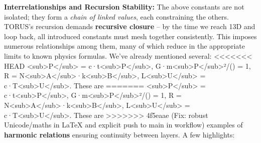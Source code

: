 \documentclass[]{article}
\begin{document}
\textbf{Interrelationships and Recursion Stability:} The above constants
are not isolated; they form a \emph{chain of linked values}, each
constraining the others. TORUS's recursion demands \textbf{recursive
closure} -- by the time we reach 13D and loop back, all introduced
constants must mesh together consistently. This imposes numerous
relationships among them, many of which reduce in the appropriate limits
to known physics formulas. We've already mentioned several:
<<<<<<< HEAD
\ell\textless sub\textgreater P\textless/sub\textgreater{} =
c·t\textless sub\textgreater P\textless/sub\textgreater,
G·m\textless sub\textgreater P\textless/sub\textgreater²/(\hbarc) = 1, R =
N\textless sub\textgreater A\textless/sub\textgreater·k\textless sub\textgreater B\textless/sub\textgreater,
L\textless sub\textgreater U\textless/sub\textgreater{} =
c·T\textless sub\textgreater U\textless/sub\textgreater. These are
=======
\ell\textless{}sub\textgreater{}P\textless{}/sub\textgreater{} =
c·t\textless{}sub\textgreater{}P\textless{}/sub\textgreater{},
G·m\textless{}sub\textgreater{}P\textless{}/sub\textgreater{}²/(\hbarc) = 1,
R =
N\textless{}sub\textgreater{}A\textless{}/sub\textgreater{}·k\textless{}sub\textgreater{}B\textless{}/sub\textgreater{},
L\textless{}sub\textgreater{}U\textless{}/sub\textgreater{} =
c·T\textless{}sub\textgreater{}U\textless{}/sub\textgreater{}. These are
>>>>>>> 4f5eaae (Fix: robust Unicode/maths in LaTeX and explicit push to main in workflow)
examples of \textbf{harmonic relations} ensuring continuity between
layers. A few highlights:
\end{document}
